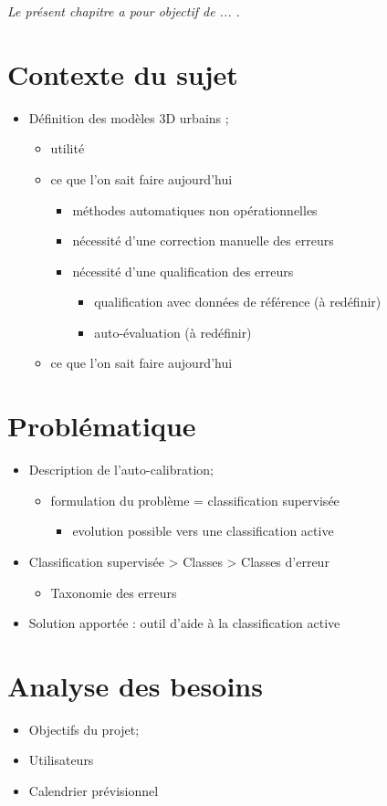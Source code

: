 
\textit{Le présent chapitre a pour objectif de ... . }

\section{Contexte du sujet}

\begin{itemize}
	\item Définition des modèles 3D urbains ;
	\begin{itemize}
		\item utilité
		\item ce que l'on sait faire aujourd'hui
		\begin{itemize}
			\item méthodes automatiques non opérationnelles
			\item nécessité d'une correction manuelle des erreurs
			\item nécessité d'une qualification des erreurs
			\begin{itemize}
				\item qualification avec données de référence (à redéfinir)
				\item auto-évaluation (à redéfinir)
			\end{itemize}
		\end{itemize}
		\item ce que l'on sait faire aujourd'hui
	\end{itemize}
\end{itemize}


\section{Problématique}

\begin{itemize}
	\item Description de l'auto-calibration;
	\begin{itemize}
		\item formulation du problème = classification supervisée
		\begin{itemize}
			\item evolution possible vers une classification active
		\end{itemize}
	\end{itemize}
	\item Classification supervisée > Classes > Classes d'erreur
	\begin{itemize}
		\item Taxonomie des erreurs
	\end{itemize}
	\item Solution apportée : outil d'aide à la classification active
\end{itemize}

\section{Analyse des besoins}

\begin{itemize}
	\item Objectifs du projet;
	\item Utilisateurs
	\item Calendrier prévisionnel
\end{itemize}
